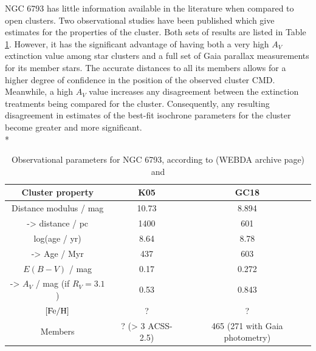 \documentclass[12pt, a4paper]{report}
\begin{document}
NGC 6793 has little information available in the literature when compared to open clusters. Two observational studies have been published which give estimates for the properties of the cluster. Both sets of results are listed in Table \ref{NGC6793_obs}. However, it has the significant advantage of having both a very high $A_{V}$ extinction value among star clusters and a full set of Gaia parallax measurements for its member stars. The accurate distances to all its members allows for a higher degree of confidence in the position of the observed cluster CMD. Meanwhile, a high $A_{V}$ value increases any disagreement between the extinction treatments being compared for the cluster. Consequently, any resulting disagreement in estimates of the best-fit isochrone parameters for the cluster become greater and more significant. \\*

\begin{table}
\begin{center}
\begin{tabular}{ccc}
\hline
Cluster property & K05 & GC18 \\
\hline
Distance modulus / mag & 10.73 & 8.894 \\
-> distance / pc & 1400 & 601 \\
log(age / yr) & 8.64 & 8.78 \\
-> Age / Myr & 437 & 603 \\
$E(B-V)$ / mag & 0.17 & 0.272 \\
-> $A_{V}$ / mag (if $R_{V} = 3.1$) & 0.53 & 0.843 \\
$\textnormal{[Fe/H]}$ & ? & ? \\
Members & ? (> 3 ACSS-2.5) & 465 (271 with Gaia photometry) \\
\hline
\end{tabular}
\caption{Observational parameters for NGC 6793, according to \cite{2005A&A...438.1163K} (WEBDA archive page) and \cite{2018A&A...616A..10G}}
\label{NGC6793_obs}
\end{center}
\end{table}
\end{document}
